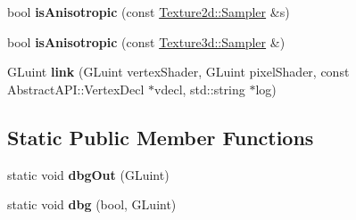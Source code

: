 \begin{DoxyCompactItemize}
\item 
\hypertarget{struct_g_l_s_l_1_1_data_abf9a0755cff785392b0ecb78e4f64a99}{bool {\bfseries is\+Anisotropic} (const \hyperlink{struct_tempest_1_1_texture2d_1_1_sampler}{Texture2d\+::\+Sampler} \&s)}\label{struct_g_l_s_l_1_1_data_abf9a0755cff785392b0ecb78e4f64a99}

\item 
\hypertarget{struct_g_l_s_l_1_1_data_a54093da67f84935fd573f3d336b8ca58}{bool {\bfseries is\+Anisotropic} (const \hyperlink{struct_tempest_1_1_texture3d_1_1_sampler}{Texture3d\+::\+Sampler} \&)}\label{struct_g_l_s_l_1_1_data_a54093da67f84935fd573f3d336b8ca58}

\item 
\hypertarget{struct_g_l_s_l_1_1_data_a5dc59d87cd79d431cd46a0cc9ee59c52}{G\+Luint {\bfseries link} (G\+Luint vertex\+Shader, G\+Luint pixel\+Shader, const Abstract\+A\+P\+I\+::\+Vertex\+Decl $\ast$vdecl, std\+::string $\ast$log)}\label{struct_g_l_s_l_1_1_data_a5dc59d87cd79d431cd46a0cc9ee59c52}

\end{DoxyCompactItemize}
\subsection*{Static Public Member Functions}
\begin{DoxyCompactItemize}
\item 
\hypertarget{struct_g_l_s_l_1_1_data_a948e262d20b78600bbf6305c1e229b15}{static void {\bfseries dbg\+Out} (G\+Luint)}\label{struct_g_l_s_l_1_1_data_a948e262d20b78600bbf6305c1e229b15}

\item 
\hypertarget{struct_g_l_s_l_1_1_data_a3dba8e7a31d32ce2f6bbd82048a7092a}{static void {\bfseries dbg} (bool, G\+Luint)}\label{struct_g_l_s_l_1_1_data_a3dba8e7a31d32ce2f6bbd82048a7092a}

\end{DoxyCompactItemize}
